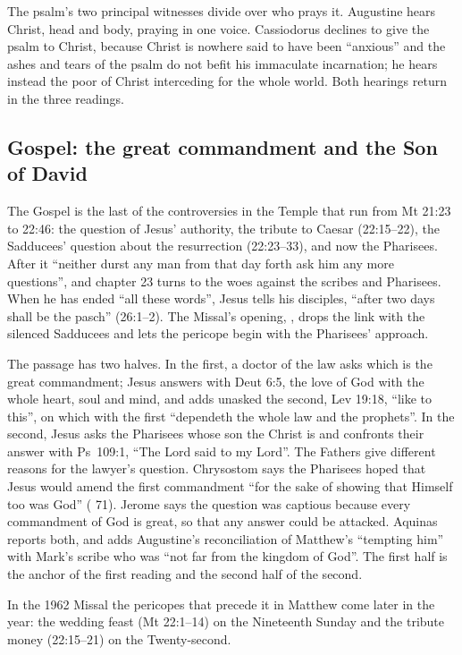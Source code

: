 The psalm's two principal witnesses divide over who prays it. Augustine hears Christ, head and
body, praying in one voice. Cassiodorus declines to give the psalm to Christ,
because Christ is nowhere said to have been ``anxious'' and the ashes and tears
of the psalm do not befit his immaculate incarnation; he hears instead the
poor of Christ interceding for the whole world. Both hearings return in the
three readings.

\subsection{Gospel: the great commandment and the Son of David}

The Gospel is the last of the controversies in the Temple that run from Mt
21:23 to 22:46: the question of Jesus' authority, the tribute to Caesar
(22:15--22), the Sadducees' question about the resurrection (22:23--33), and
now the Pharisees. After it ``neither durst any man from that day forth ask him
any more questions'', and chapter 23 turns to the woes against the scribes and
Pharisees. When he has ended ``all these words'', Jesus tells his disciples,
``after two days shall be the pasch'' (26:1--2). The Missal's opening, , drops the
link with the silenced Sadducees and lets the pericope begin with the
Pharisees' approach.

The passage has two halves. In the first, a doctor of the law asks which is the
great commandment; Jesus answers with Deut 6:5, the love of God with the whole
heart, soul and mind, and adds unasked the second, Lev 19:18, ``like to this'',
on which with the first ``dependeth the whole law and the prophets''. In the
second, Jesus asks the Pharisees whose son the Christ is and confronts their
answer with Ps~109:1, ``The Lord said to my Lord''. The Fathers give different
reasons for the lawyer's question. Chrysostom says the Pharisees hoped that
Jesus would amend the first commandment ``for the sake of showing that Himself
too was God'' ( 71). Jerome says the question was
captious because every commandment of God is great, so that any answer could
be attacked. Aquinas reports both, and adds Augustine's reconciliation of
Matthew's ``tempting him'' with Mark's scribe who was ``not far from the
kingdom of God''. The first half is the anchor of the first reading and the
second half of the second.

In the 1962 Missal the pericopes that precede it in
Matthew come later in the year: the wedding feast (Mt 22:1--14) on the
Nineteenth Sunday and the tribute money (22:15--21) on the Twenty-second.

